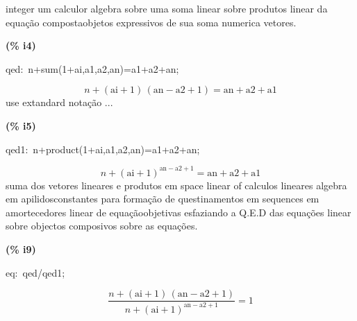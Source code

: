 \documentclass[fleqn]{article}
\begin{document}
integer um calculor algebra sobre uma soma linear sobre produtos linear da equação compostaobjetos expressivos de sua soma numerica vetores.


\noindent
\begin{minipage}[t]{4.000000em}\color{red}\bfseries
(\% i4)	
\end{minipage}
\begin{minipage}[t]{\textwidth}\color{blue}
qed:\ n+sum(1+ai,a1,a2,an)=a1+a2+an;
\end{minipage}
\[\displaystyle \tag{qed} 
n\mathop{+}\left( \ensuremath{\mathrm{ai}}\mathop{+}1\right) \, \left( \ensuremath{\mathrm{an}}\mathop{-}\ensuremath{\mathrm{a2}}\mathop{+}1\right) \mathop{=}\ensuremath{\mathrm{an}}\mathop{+}\ensuremath{\mathrm{a2}}\mathop{+}\ensuremath{\mathrm{a1}}\mbox{}
\]
use extandard notação ...


\noindent
\begin{minipage}[t]{4.000000em}\color{red}\bfseries
(\% i5)	
\end{minipage}
\begin{minipage}[t]{\textwidth}\color{blue}
qed1:\ n+product(1+ai,a1,a2,an)=a1+a2+an;
\end{minipage}
\[\displaystyle \tag{qed1} 
n\mathop{+}{{\left( \ensuremath{\mathrm{ai}}\mathop{+}1\right) }^{\ensuremath{\mathrm{an}}\mathop{-}\ensuremath{\mathrm{a2}}\mathop{+}1}}\mathop{=}\ensuremath{\mathrm{an}}\mathop{+}\ensuremath{\mathrm{a2}}\mathop{+}\ensuremath{\mathrm{a1}}\mbox{}
\]
suma dos vetores lineares e produtos em space linear of calculos lineares algebra em apilidosconstantes para formação de questinamentos em sequences em amortecedores linear de equaçãoobjetivas esfaziando a Q.E.D  das equações linear sobre objectos composivos sobre as equações.


\noindent
\begin{minipage}[t]{4.000000em}\color{red}\bfseries
(\% i9)	
\end{minipage}
\begin{minipage}[t]{\textwidth}\color{blue}
eq:\ qed/qed1;
\end{minipage}
\[\displaystyle \tag{eq} 
\frac{n\mathop{+}\left( \ensuremath{\mathrm{ai}}\mathop{+}1\right) \, \left( \ensuremath{\mathrm{an}}\mathop{-}\ensuremath{\mathrm{a2}}\mathop{+}1\right) }{n\mathop{+}{{\left( \ensuremath{\mathrm{ai}}\mathop{+}1\right) }^{\ensuremath{\mathrm{an}}\mathop{-}\ensuremath{\mathrm{a2}}\mathop{+}1}}}\mathop{=}1\mbox{}
\]
\end{document}
